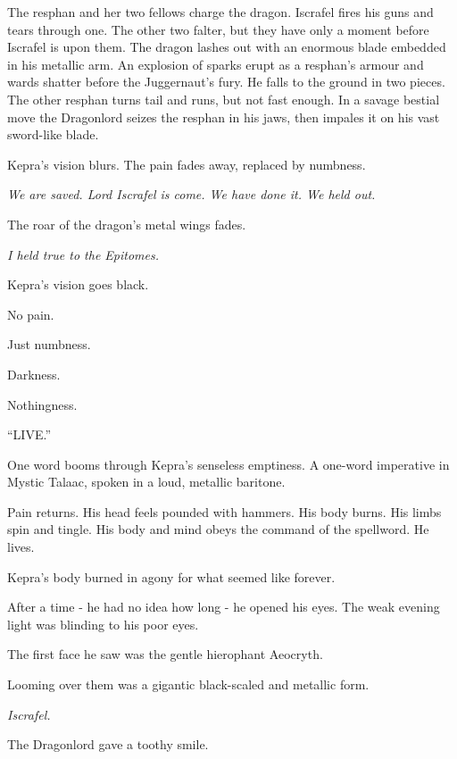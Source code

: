 \documentclass
  [a4paper,
   12pt,
   oneside
  ]%
  {article}
\newcommand{\sectionbreak}{\bigskip\noindent}
\begin{document}
The resphan and her two fellows charge the dragon. 
Iscrafel fires his guns and tears through one. 
The other two falter, but they have only a moment before Iscrafel is upon them. 
The dragon lashes out with an enormous blade embedded in his metallic arm. 
An explosion of sparks erupt as a resphan’s armour and wards shatter before the Juggernaut’s fury. 
He falls to the ground in two pieces. 
The other resphan turns tail and runs, but not fast enough. 
In a savage bestial move the Dragonlord seizes the resphan in his jaws, then impales it on his vast sword-like blade. 

Kepra’s vision blurs. 
The pain fades away, replaced by numbness.

\emph{We are saved. Lord Iscrafel is come. We have done it. We held out.}

The roar of the dragon’s metal wings fades. 

\emph{I held true to the Epitomes.}

Kepra’s vision goes black. 

No pain. 

Just numbness. 

Darkness.

Nothingness.

\sectionbreak
{\Large{``{LIVE.}''}}

One word booms through Kepra’s senseless emptiness. 
A one-word imperative in Mystic Talaac, spoken in a loud, metallic baritone. 

Pain returns. 
His head feels pounded with hammers. 
His body burns. 
His limbs spin and tingle. %
His body and mind obeys the command of the spellword. 
He lives.

\sectionbreak
Kepra's body burned in agony for what seemed like forever. 

After a time - he had no idea how long - he opened his eyes. 
The weak evening light was blinding to his poor eyes. 

The first face he saw was the gentle hierophant Aeocryth. 

Looming over them was a gigantic black-scaled and metallic form.

\emph{Iscrafel.}


The Dragonlord gave a toothy smile.
\end{document}
